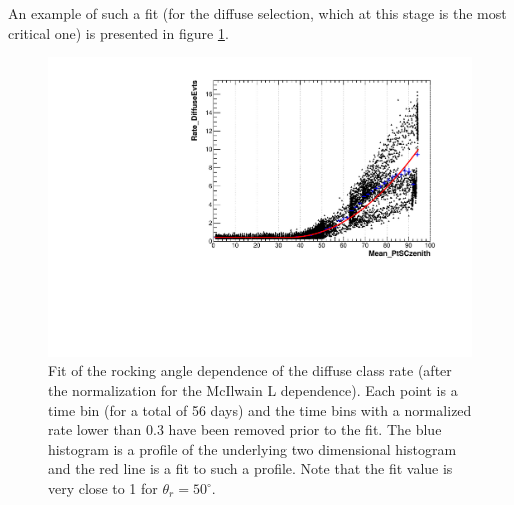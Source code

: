 \documentclass[a4paper,twocolumn]{article}
\begin{document}
An example of such a fit (for the diffuse selection, which at this stage is the
most critical one) is presented in figure \ref{DiffuseEvts_zenith}.
\begin{figure}[htb!]
  \begin{center}
    \includegraphics[width=\linewidth]{figures/DiffuseEvts_zenith}
    \caption{Fit of the rocking angle dependence of the diffuse class
      rate (after the normalization for the McIlwain L dependence).
      Each point is a time bin (for a total of 56 days) and the time bins
      with a normalized rate lower than 0.3 have been removed prior to the
      fit. The blue histogram is a profile of the underlying two dimensional
      histogram and the red line is a fit to such a profile.
      Note that the fit value is very close to 1 for $\theta_r = 50^\circ$.}
    \label{DiffuseEvts_zenith}
  \end{center}
\end{figure}
\end{document}
